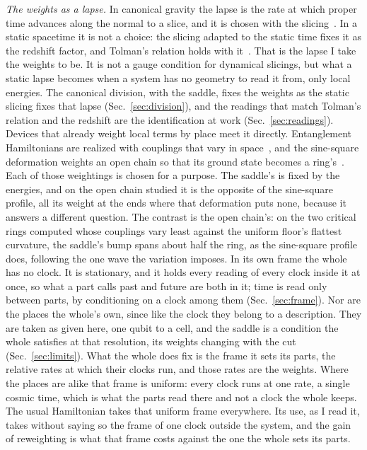 \documentclass[aps,prd,reprint,superscriptaddress]{revtex4-2}
\begin{document}
\emph{The weights as a lapse.} In canonical gravity the lapse is the rate at which proper time advances along the normal to a slice, and it is chosen with the slicing~\cite{Gourgoulhon2007}. In a static spacetime it is not a choice: the slicing adapted to the static time fixes it as the redshift factor, and Tolman's relation holds with it~\cite{Tolman1930}. That is the lapse I take the weights to be. It is not a gauge condition for dynamical slicings, but what a static lapse becomes when a system has no geometry to read it from, only local energies. The canonical division, with the saddle, fixes the weights as the static slicing fixes that lapse (Sec.~\ref{sec:division}), and the readings that match Tolman's relation and the redshift are the identification at work (Sec.~\ref{sec:readings}). Devices that already weight local terms by place meet it directly. Entanglement Hamiltonians are realized with couplings that vary in space~\cite{DalmonteVermerschZoller2018}, and the sine-square deformation weights an open chain so that its ground state becomes a ring's~\cite{HikiharaNishino2011}. Each of those weightings is chosen for a purpose. The saddle's is fixed by the energies, and on the open chain studied it is the opposite of the sine-square profile, all its weight at the ends where that deformation puts none, because it answers a different question. The contrast is the open chain's: on the two critical rings computed whose couplings vary least against the uniform floor's flattest curvature, the saddle's bump spans about half the ring, as the sine-square profile does, following the one wave the variation imposes. In its own frame the whole has no clock. It is stationary, and it holds every reading of every clock inside it at once, so what a part calls past and future are both in it; time is read only between parts, by conditioning on a clock among them (Sec.~\ref{sec:frame}). Nor are the places the whole's own, since like the clock they belong to a description. They are taken as given here, one qubit to a cell, and the saddle is a condition the whole satisfies at that resolution, its weights changing with the cut (Sec.~\ref{sec:limits}). What the whole does fix is the frame it sets its parts, the relative rates at which their clocks run, and those rates are the weights. Where the places are alike that frame is uniform: every clock runs at one rate, a single cosmic time, which is what the parts read there and not a clock the whole keeps. The usual Hamiltonian takes that uniform frame everywhere. Its use, as I read it, takes without saying so the frame of one clock outside the system, and the gain of reweighting is what that frame costs against the one the whole sets its parts.
\end{document}

